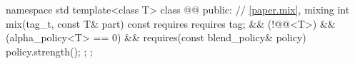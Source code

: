 \begin{codeblock}
namespace std {
  template<class T>
  class @@ {
  public:
    // \ref{paper.mix}, mixing
    int mix(tag_t, const T& part) const
      requires requires { tag; } && (!@@<T>) && (alpha_policy<T> == 0) &&
               requires(const blend_policy& policy) { policy.strength(); };
  };
}
\end{codeblock}

